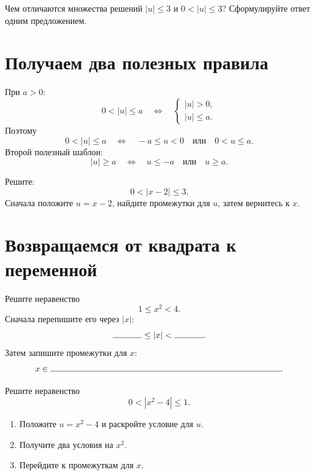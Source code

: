 \begin{reflectionbox}[Сравните]
  Чем отличаются множества решений \(|u|\le3\) и \(0<|u|\le3\)?
  Сформулируйте ответ одним предложением.
\end{reflectionbox}

\section{Получаем два полезных правила}

\begin{fillbox}
  При \(a>0\):
  \[
    0<|u|\le a
    \quad\Longleftrightarrow\quad
    \begin{cases}
      |u|>0,\\
      |u|\le a.
    \end{cases}
  \]
  Поэтому
  \[
    0<|u|\le a
    \quad\Longleftrightarrow\quad
    -a\le u<0
    \quad\text{или}\quad
    0<u\le a.
  \]
  Второй полезный шаблон:
  \[
    |u|\ge a
    \quad\Longleftrightarrow\quad
    u\le-a
    \quad\text{или}\quad
    u\ge a.
  \]
\end{fillbox}

\begin{checkpointbox}
  Решите:
  \[
    0<|x-2|\le3.
  \]
  Сначала положите \(u=x-2\), найдите промежутки для \(u\), затем вернитесь
  к \(x\).
  \workarea{20mm}
  \longanswerline
\end{checkpointbox}

\newpage
\section{Возвращаемся от квадрата к переменной}

\begin{fillbox}
  Решите неравенство
  \[
    1\le x^2<4.
  \]
  Сначала перепишите его через \(|x|\):
  \[
    \answerblank[12mm]\le|x|<\answerblank[12mm].
  \]
  Затем запишите промежутки для \(x\):
  \[
    x\in\answerblank[95mm].
  \]
\end{fillbox}

\begin{checkpointbox}
  Решите неравенство
  \[
    0<|x^2-4|\le1.
  \]
  \begin{enumerate}
    \item Положите \(u=x^2-4\) и раскройте условие для \(u\).
    \item Получите два условия на \(x^2\).
    \item Перейдите к промежуткам для \(x\).
  \end{enumerate}
  \workarea{20mm}
  \longanswerline
\end{checkpointbox}

